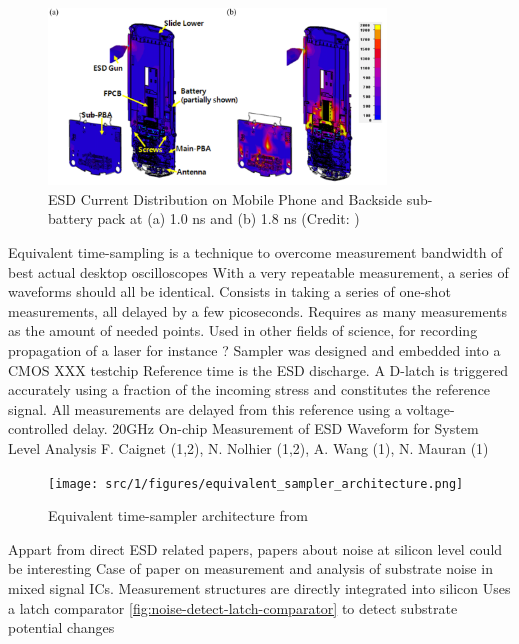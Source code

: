 \begin{figure}[!h]
  \centering
  \includegraphics[width=0.8\textwidth]{src/1/figures/current_distribution_mobile.png}
  \caption{ESD Current Distribution on Mobile Phone and Backside sub-battery pack at (a) 1.0 ns and (b) 1.8 ns (Credit: \cite{softFailMobile})}
  \label{fig:mobile-phone-3d-em}
\end{figure}

Equivalent time-sampling is a technique to overcome measurement bandwidth of best actual desktop oscilloscopes
With a very repeatable measurement, a series of waveforms should all be identical.
Consists in taking a series of one-shot measurements, all delayed by a few picoseconds.
Requires as many measurements as the amount of needed points.
Used in other fields of science, for recording propagation of a laser for instance ?
Sampler was designed and embedded into a CMOS XXX testchip
Reference time is the ESD discharge.
A D-latch is triggered accurately using a fraction of the incoming stress and constitutes the reference signal.
All measurements are delayed from this reference using a voltage-controlled delay.
20GHz On-chip Measurement of ESD Waveform for System Level Analysis F. Caignet (1,2), N. Nolhier (1,2), A. Wang (1), N. Mauran (1)

\begin{figure}[!h]
  \centering
  \texttt{[image: src/1/figures/equivalent\_sampler\_architecture.png]}
  \caption{Equivalent time-sampler architecture from \cite{}}
  \label{fig:eq-time-sampler-architecture}
\end{figure}

Appart from direct ESD related papers, papers about noise at silicon level could be interesting
Case of paper on measurement and analysis of substrate noise in mixed signal ICs.
Measurement structures are directly integrated into silicon
Uses a latch comparator \ref{fig:noise-detect-latch-comparator} to detect substrate potential changes

